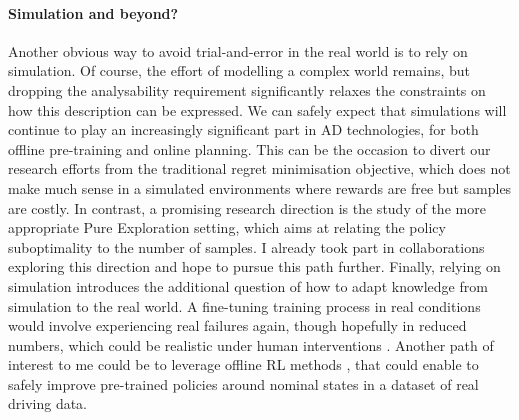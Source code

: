 \paragraph{Simulation and beyond?}

Another obvious way to avoid trial-and-error in the real world is to rely on simulation. Of course, the effort of modelling a complex world remains, but dropping the analysability requirement significantly relaxes the constraints on how this description can be expressed. We can safely expect that simulations will continue to play an increasingly significant part in \gls{AD} technologies, for both offline pre-training and online planning. This can be the occasion to divert our research efforts from the traditional regret minimisation objective, which does not make much sense in a simulated environments where rewards are free but samples are costly. In contrast, a promising research direction is the study of the more appropriate Pure Exploration setting, which aims at relating the policy suboptimality to the number of samples. I already took part in collaborations exploring this direction \citep{Jonsson2020planning,Kaufmann2020adaptive,Menard2020Fast} and hope to pursue this path further. 
Finally, relying on simulation introduces the additional question of how to adapt knowledge from simulation to the real world. A fine-tuning training process in real conditions would involve experiencing real failures again, though hopefully in reduced numbers, which could be realistic under human interventions \citep{Saunders2018,Kendall2019}. Another path of interest to me could be to leverage offline \gls{RL} methods \citep{Thomas2015,Laroche2019}, that could enable to safely improve pre-trained policies around nominal states in a dataset of real driving data.
